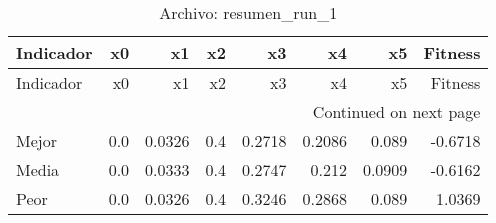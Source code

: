 \begin{longtable}{lrrrrrrr}
\caption{Archivo: resumen\_run\_1}\label{tab:resumen_run_1} \\
\toprule
Indicador & x0 & x1 & x2 & x3 & x4 & x5 & Fitness \\
\midrule
\endfirsthead
\toprule
Indicador & x0 & x1 & x2 & x3 & x4 & x5 & Fitness \\
\midrule
\endhead
\midrule
\multicolumn{8}{r}{Continued on next page} \\
\midrule
\endfoot
\bottomrule
\endlastfoot
Mejor & 0.0 & 0.0326 & 0.4 & 0.2718 & 0.2086 & 0.089 & -0.6718 \\
Media & 0.0 & 0.0333 & 0.4 & 0.2747 & 0.212 & 0.0909 & -0.6162 \\
Peor & 0.0 & 0.0326 & 0.4 & 0.3246 & 0.2868 & 0.089 & 1.0369 \\
\end{longtable}